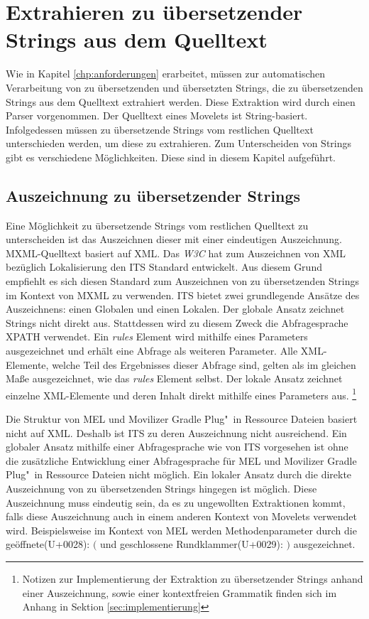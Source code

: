 \chapter{Extrahieren zu übersetzender Strings aus dem Quelltext}
\label{chp:extract}
Wie in Kapitel \ref{chp:anforderungen} erarbeitet, müssen zur automatischen Verarbeitung von zu übersetzenden und übersetzten Strings, die zu übersetzenden Strings aus dem Quelltext extrahiert werden. Diese Extraktion wird durch einen Parser vorgenommen. Der Quelltext eines Movelets ist String-basiert.
\autocite[Vgl.][]{Nitschkowski.2018c}
Infolgedessen  müssen zu übersetzende Strings vom restlichen Quelltext unterschieden werden, um diese zu extrahieren. Zum Unterscheiden von Strings gibt es verschiedene Möglichkeiten. Diese sind in diesem Kapitel aufgeführt.
\section{Auszeichnung zu übersetzender Strings}
Eine Möglichkeit zu übersetzende Strings vom restlichen Quelltext zu unterscheiden ist das Auszeichnen dieser mit einer eindeutigen Auszeichnung. \ac{MXML}-Quelltext basiert auf \ac{XML}.
\autocite[Vgl.][]{Nitschkowski.2018c}
Das \textit{\ac{W3C}} hat zum Auszeichnen von \ac{XML} bezüglich Lokalisierung den \ac{ITS} Standard entwickelt. Aus diesem Grund empfiehlt es sich diesen Standard zum Auszeichnen von zu übersetzenden Strings im Kontext von \ac{MXML} zu verwenden. \ac{ITS} bietet zwei grundlegende Ansätze des Auszeichnens: einen Globalen und einen Lokalen. Der globale Ansatz zeichnet Strings nicht direkt aus. Stattdessen wird zu diesem Zweck die Abfragesprache \ac{XPATH} verwendet. Ein \mbox{\textit{rules}} Element wird mithilfe eines Parameters ausgezeichnet und erhält eine Abfrage als weiteren Parameter. Alle \ac{XML}-Elemente, welche Teil des Ergebnisses dieser Abfrage sind, gelten als im gleichen Maße ausgezeichnet, wie das \mbox{\textit{rules}} Element selbst. Der lokale Ansatz zeichnet einzelne \ac{XML}-Elemente und deren Inhalt direkt mithilfe eines Parameters aus.
\autocite[Vgl.][]{Filip.2013}
\footnote{Notizen zur Implementierung der Extraktion zu übersetzender Strings anhand einer Auszeichnung, sowie einer kontextfreien Grammatik finden sich im Anhang in Sektion \ref{sec:implementierung}}
\par
Die Struktur von \ac{MEL} und Movilizer Gradle Plug"~in Ressource Dateien basiert nicht auf \ac{XML}.
\autocite[Vgl.][]{Nitschkowski.2018e} \autocite[Vgl.][]{Mula.2018}
Deshalb ist \ac{ITS} zu deren Auszeichnung nicht ausreichend. Ein globaler Ansatz mithilfe einer Abfragesprache wie von \ac{ITS} vorgesehen ist ohne die zusätzliche Entwicklung einer Abfragesprache für \ac{MEL} und Movilizer Gradle Plug"~in Ressource Dateien nicht möglich. Ein lokaler Ansatz durch die direkte Auszeichnung von zu übersetzenden Strings hingegen ist möglich. Diese Auszeichnung muss eindeutig sein, da es zu ungewollten Extraktionen kommt, falls diese Auszeichnung auch in einem anderen Kontext von Movelets verwendet wird. Beispielsweise im Kontext von \ac{MEL} werden Methodenparameter durch die geöffnete(U+0028): $($ und geschlossene Rundklammer(U+0029): $)$ ausgezeichnet.
